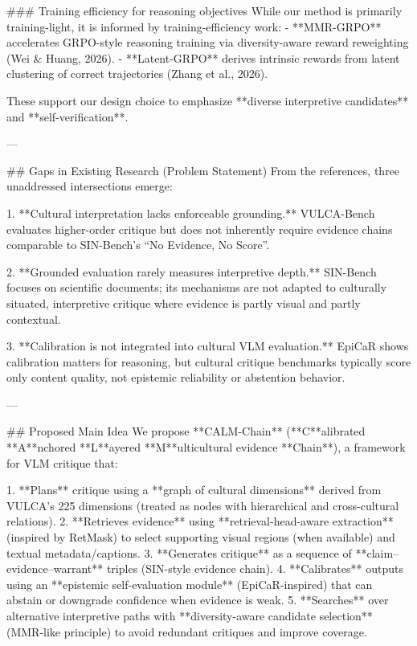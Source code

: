 ### Training efficiency for reasoning objectives
While our method is primarily training-light, it is informed by training-efficiency work:
- **MMR-GRPO** accelerates GRPO-style reasoning training via diversity-aware reward reweighting (Wei & Huang, 2026).
- **Latent-GRPO** derives intrinsic rewards from latent clustering of correct trajectories (Zhang et al., 2026).

These support our design choice to emphasize **diverse interpretive candidates** and **self-verification**.

---

## Gaps in Existing Research (Problem Statement)
From the references, three unaddressed intersections emerge:

1. **Cultural interpretation lacks enforceable grounding.**  
   VULCA-Bench evaluates higher-order critique but does not inherently require evidence chains comparable to SIN-Bench’s “No Evidence, No Score”.

2. **Grounded evaluation rarely measures interpretive depth.**  
   SIN-Bench focuses on scientific documents; its mechanisms are not adapted to culturally situated, interpretive critique where evidence is partly visual and partly contextual.

3. **Calibration is not integrated into cultural VLM evaluation.**  
   EpiCaR shows calibration matters for reasoning, but cultural critique benchmarks typically score only content quality, not epistemic reliability or abstention behavior.

---

## Proposed Main Idea
We propose **CALM-Chain** (**C**alibrated **A**nchored **L**ayered **M**ulticultural evidence **Chain**), a framework for VLM critique that:

1. **Plans** critique using a **graph of cultural dimensions** derived from VULCA’s 225 dimensions (treated as nodes with hierarchical and cross-cultural relations).
2. **Retrieves evidence** using **retrieval-head-aware extraction** (inspired by RetMask) to select supporting visual regions (when available) and textual metadata/captions.
3. **Generates critique** as a sequence of **claim–evidence–warrant** triples (SIN-style evidence chain).
4. **Calibrates** outputs using an **epistemic self-evaluation module** (EpiCaR-inspired) that can abstain or downgrade confidence when evidence is weak.
5. **Searches** over alternative interpretive paths with **diversity-aware candidate selection** (MMR-like principle) to avoid redundant critiques and improve coverage.

